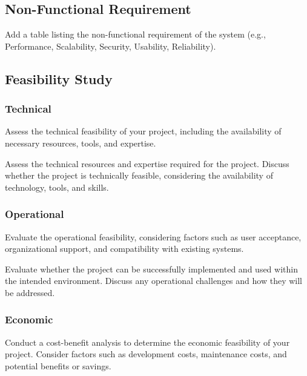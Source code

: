 \subsection{Non-Functional Requirement}
Add a table listing the non-functional requirement of the system (e.g., Performance, Scalability, Security, Usability, Reliability).

\subsection{Feasibility Study}
\subsubsection{Technical}
 Assess the technical feasibility of your project, including the availability of necessary resources, tools, and expertise.

Assess the technical resources and expertise required for the project. Discuss whether the project is technically feasible, considering the availability of technology, tools, and skills.
 
\subsubsection{Operational}
Evaluate the operational feasibility, considering factors such as user acceptance, organizational support, and compatibility with existing systems.

Evaluate whether the project can be successfully implemented and used within the intended environment. Discuss any operational challenges and how they will be addressed.

\subsubsection{Economic}
 Conduct a cost-benefit analysis to determine the economic feasibility of your project. Consider factors such as development costs, maintenance costs, and potential benefits or savings.

